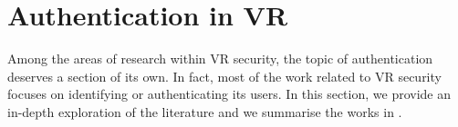 \documentclass[journal]{IEEEtran}
\begin{document}

\section{Authentication in VR}\label{sec:authentication}
Among the areas of research within VR security, the topic of authentication deserves a section of its own. In fact, most of the work related to VR security focuses on identifying or authenticating its users. In this section, we provide an in-depth exploration of the literature and we summarise the works in .
\end{document}
